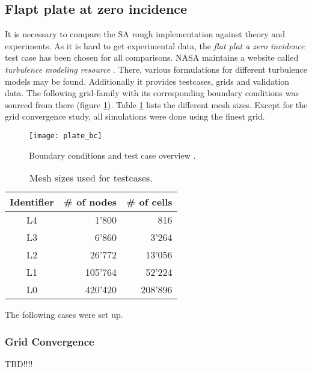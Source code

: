 \subsection{Flapt plate at zero incidence}
\label{subsec:flat_plate_exp}
It is necessary to compare the SA rough implementation against theory and
experiments. As it is hard to get experimental data, the \textit{flat plat a
zero incidence} test case has been chosen for all comparisons. NASA maintains a
website called \textit{turbulence modeling resource} \cite{rumsey_flat}. There,
various formulations for different turbulence models may be found. Additionally
it provides testcases, grids and validation data. The following grid-family with
its corresponding boundary conditions was sourced from there (figure
\ref{fig:plate_bc}). Table \ref{tab:plate_sizes} lists the different mesh sizes.
Except for the grid convergence study, all simulations were done using the
finest grid.

\begin{figure}[H] \centering
\texttt{[image: plate\_bc]}
    \caption{Boundary conditions and test case overview \cite{rumsey_flat}.}
    \label{fig:plate_bc}
\end{figure}

\begin{table}[H]
  \centering
  \begin{tabular}{c r r}
    Identifier      & \# of nodes   & \# of cells \\
    \toprule
    L4              & 1'800         & 816 \\
    L3              & 6'860         & 3'264 \\
    L2              & 26'772        & 13'056 \\
    L1              & 105'764       & 52'224 \\
    L0              & 420'420       & 208'896 \\

  \end{tabular}
  \caption{Mesh sizes used for testcases.}
  \label{tab:plate_sizes}
\end{table}

\noindent The following cases were set up.

\subsubsection{Grid Convergence}

TBD!!!!

